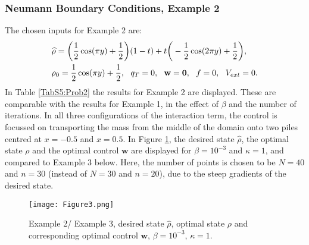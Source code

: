 \subsubsection{Neumann Boundary Conditions, Example 2} 
The chosen inputs for Example 2 are:
\begin{align*}
&\widehat \rho = \bigg(\frac{1}{2}\cos(\pi y) + \frac{1}{2}\bigg)(1-t) + t\bigg(-\frac{1}{2}\cos(2 \pi y) + \frac{1}{2}\bigg),\\
&\rho_{0} = \frac{1}{2}\cos(\pi y) + \frac{1}{2},\ \
q_{T} = 0,\ \
\mathbf{w} = \mathbf{0},\ \
f =0,\ \
V_{ext} =0.
\end{align*}
In Table \ref{TabS5:Prob2} the results for Example 2 are displayed. These are comparable with the results for Example 1, in the effect of $\beta$ and the number of iterations. In all three configurations of the interaction term, the control is focussed on transporting the mass from the middle of the domain onto two piles centred at $x=-0.5$ and $x=0.5$. In Figure \ref{Ex22DN1}, the desired state $\widehat \rho$, the optimal state $\rho$ and the optimal control $\mathbf{w}$ are displayed for $\beta = 10^{-3}$ and $\kappa = 1$, and compared to Example 3 below. Here, the number of points is chosen to be $N=40$ and $n=30$ (instead of $N=30$ and $n=20$), due to the steep gradients of the desired state.
\begin{figure}[h]
	\texttt{[image: Figure3.png]}
	\caption{Example 2/ Example 3, desired state $\widehat \rho$, optimal state $\rho$ and corresponding optimal control $\mathbf{w}$, $\beta = 10^{-3}$, $\kappa= 1$.}
	\label{Ex22DN1}
\end{figure}



